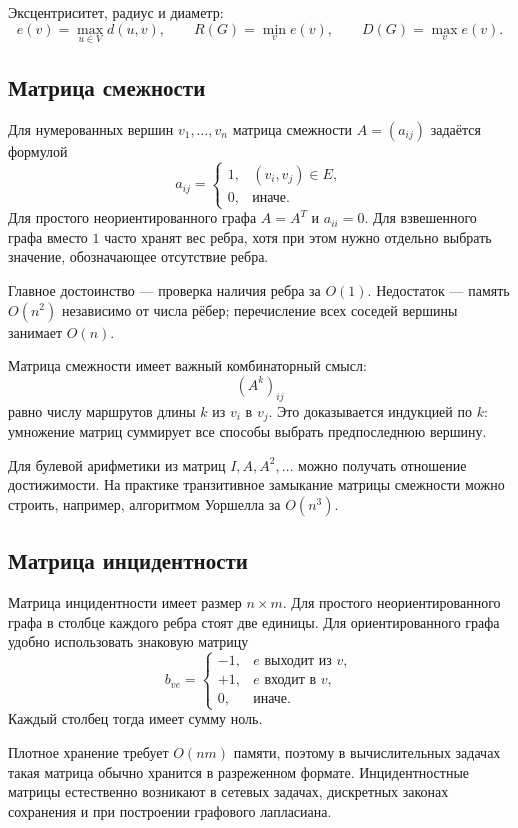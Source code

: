 Эксцентриситет, радиус и диаметр:
\[
 e(v)=\max_{u\in V}d(u,v),\qquad
 R(G)=\min_v e(v),\qquad
 D(G)=\max_v e(v).
\]

\subsection{Матрица смежности}

Для нумерованных вершин $v_1,\ldots,v_n$ матрица смежности
$A=(a_{ij})$ задаётся формулой
\[
 a_{ij}=\begin{cases}
 1,& (v_i,v_j)\in E,\\
 0,&\text{иначе.}
 \end{cases}
\]
Для простого неориентированного графа $A=A^T$ и $a_{ii}=0$.
Для взвешенного графа вместо $1$ часто хранят вес ребра, хотя при этом нужно
отдельно выбрать значение, обозначающее отсутствие ребра.

Главное достоинство --- проверка наличия ребра за $O(1)$. Недостаток --- память
$O(n^2)$ независимо от числа рёбер; перечисление всех соседей вершины занимает
$O(n)$.

Матрица смежности имеет важный комбинаторный смысл:
\[
 (A^k)_{ij}
\]
равно числу маршрутов длины $k$ из $v_i$ в $v_j$. Это доказывается индукцией по
$k$: умножение матриц суммирует все способы выбрать предпоследнюю вершину.

Для булевой арифметики из матриц $I,A,A^2,\ldots$ можно получать отношение
достижимости. На практике транзитивное замыкание матрицы смежности можно строить,
например, алгоритмом Уоршелла за $O(n^3)$.

\subsection{Матрица инцидентности}

Матрица инцидентности имеет размер $n\times m$. Для простого неориентированного
графа в столбце каждого ребра стоят две единицы. Для ориентированного графа удобно
использовать знаковую матрицу
\[
 b_{ve}=\begin{cases}
 -1,&e\text{ выходит из }v,\\
 +1,&e\text{ входит в }v,\\
 0,&\text{иначе.}
 \end{cases}
\]
Каждый столбец тогда имеет сумму ноль.

Плотное хранение требует $O(nm)$ памяти, поэтому в вычислительных задачах такая
матрица обычно хранится в разреженном формате. Инцидентностные матрицы естественно
возникают в сетевых задачах, дискретных законах сохранения и при построении
графового лапласиана.

